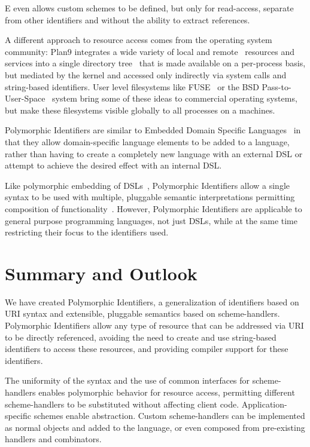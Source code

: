 \documentclass[preprint]{sigplanconf}
\begin{document}
E even allows custom schemes to be defined, but  only for read-access, separate from other identifiers and without the ability to extract references.

A different approach to resource access comes from the operating system community:  Plan9 
integrates a wide variety of local and remote~\cite{plan9network} resources and services into a single directory tree~\cite{plan9names} that is made available on a per-process basis, but mediated by the kernel and accessed only indirectly via system calls and string-based
identifiers.
User level filesystems like FUSE~\cite{fuse} or the BSD Pass-to-User-Space~\cite{kantee:puffs} 
system bring some of these ideas to commercial operating systems, but make these filesystems visible globally to all
processes on a machines. 


Polymorphic Identifiers are similar to Embedded Domain Specific Languages~\cite{edsl}
in that they allow domain-specific language elements to be added to a language, rather
than having to create a completely new language with an external DSL or attempt to 
achieve the desired effect with an internal DSL\cite{fowlerdsl}.  

Like polymorphic embedding of DSLs~\cite{polydsl}, Polymorphic Identifiers allow
a single syntax to be used with multiple, pluggable semantic interpretations permitting
composition of functionality~\cite{embeddeddsl}.  However, Polymorphic Identifiers
are applicable to general purpose programming languages, not just DSLs, while
at the same time restricting their focus to the identifiers used.





\section{Summary and Outlook}
\label{summary-and-outlook}

We have created Polymorphic Identifiers, a generalization of identifiers based on URI
syntax and extensible, pluggable semantics based on scheme-handlers.   
Polymorphic Identifiers allow any type of resource that can be addressed via URI
to be directly referenced, avoiding the need to create and use string-based identifiers 
to access these resources, and providing compiler support for these identifiers.

The uniformity of the syntax and the use of common interfaces for scheme-handlers
enables polymorphic behavior for resource access, permitting different scheme-handlers
to be substituted without affecting client code. Application-specific schemes
enable abstraction.
Custom scheme-handlers can be implemented as normal objects and added
to the language, or even composed from pre-existing handlers and
combinators.
\end{document}
